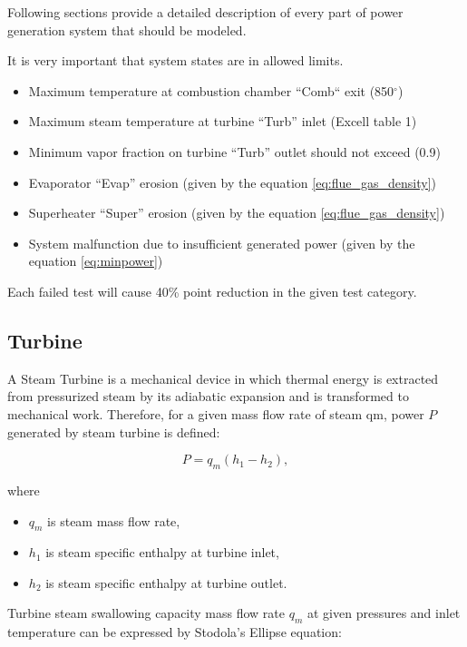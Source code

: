 \documentclass[openany]{book}
\begin{document}
	
	Following sections provide a detailed description of every part of power 
	generation system that should be modeled.
	
	
	It is very important that system states are in allowed limits. 
	
	\begin{itemize}
		\item Maximum temperature at combustion chamber “Comb“ exit 
		(850$^\circ$)
		\item Maximum steam temperature at turbine “Turb” inlet (Excell table 1)
		\item Minimum vapor fraction on turbine “Turb” outlet should not exceed (0.9)
		\item Evaporator “Evap” erosion (given by the equation 
		\ref{eq:flue_gas_density})
		\item Superheater “Super” erosion (given by the equation 
		\ref{eq:flue_gas_density})
		\item System malfunction due to insufficient generated power (given by 
		the equation \ref{eq:minpower})
	\end{itemize}
	
	Each failed test will cause 40\% point reduction in the given test category.
	
	\subsection{Turbine}
	
	A Steam Turbine is a mechanical device in which thermal energy is extracted 
	from pressurized steam by its adiabatic expansion and is transformed to 
	mechanical work.  Therefore, for a given mass flow rate of steam qm, power 
	$P$ generated by steam turbine is defined:
	
	\begin{equation}\label{eq:power}
	P = q_m(h_1 - h_2),
	\end{equation}
	
	\noindent
	where 
	
	\begin{itemize}
		\item $q_m$ is steam mass flow rate, 
		\item $h_1$ is steam specific enthalpy at turbine inlet,
		\item $h_2$ is steam specific enthalpy at turbine outlet.
	\end{itemize}
	
	Turbine steam swallowing capacity mass flow rate $q_m$ at given pressures 
	and inlet temperature can be expressed by Stodola’s Ellipse equation:
	
\end{document}
